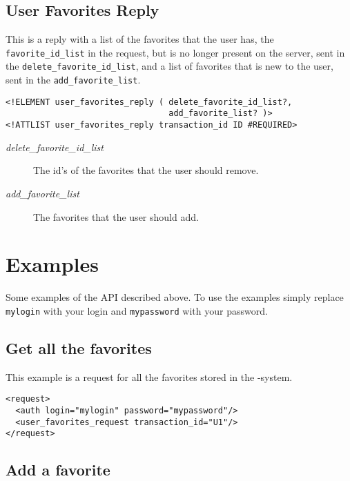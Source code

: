 \subsection{User Favorites Reply}

This is a reply with a list of the favorites that the user has, the 
\texttt{favorite\_id\_list} in the request, but is no longer present on
the server, sent in the \texttt{delete\_favorite\_id\_list}, and
a list of favorites that is new to the user, sent in the 
\texttt{add\_favorite\_list}.

\begin{verbatim}
<!ELEMENT user_favorites_reply ( delete_favorite_id_list?,
                                 add_favorite_list? )>
<!ATTLIST user_favorites_reply transaction_id ID #REQUIRED>
\end{verbatim}
\begin{description}
\item[\emph{delete\_favorite\_id\_list}] The id's of the favorites that the
  user should remove.
\item[\emph{add\_favorite\_list}] The favorites that the user should
  add.
\end{description}


\newpage
\section{Examples}

Some examples of the API described above.
To use the examples simply replace \texttt{mylogin} with your login and
\texttt{mypassword} with your password.

\subsection{Get all the favorites}

This example is a request for all the favorites stored in the \mc-system.

\begin{verbatim}
<request>
  <auth login="mylogin" password="mypassword"/>
  <user_favorites_request transaction_id="U1"/>
</request>
\end{verbatim}

\subsection{Add a favorite}


